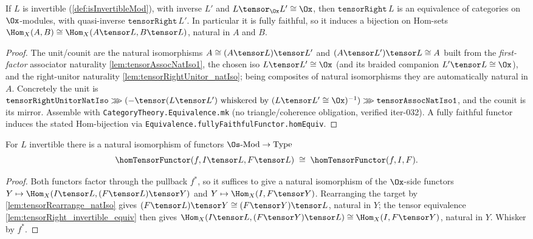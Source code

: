\begin{lemma}

  \label{lem:tensorRight_invertible_equiv}
  If $L$ is invertible (\cref{def:isInvertibleMod}), with inverse $L'$ and
  $L \tensor_{\Ox} L' \cong \Ox$, then $\texttt{tensorRight}\,L$ is an equivalence of
  categories on $\Ox$-modules, with quasi-inverse $\texttt{tensorRight}\,L'$. In
  particular it is fully faithful, so it induces a bijection on Hom-sets
  $\Hom_X(A,B) \cong \Hom_X(A \tensor L, B \tensor L)$, natural in $A$ and $B$.
  \begin{proof}
    The unit/counit are the natural isomorphisms
    $A \cong (A \tensor L) \tensor L'$ and $(A \tensor L') \tensor L \cong A$ built from the
    \emph{first-factor} associator naturality \cref{lem:tensorAssocNatIso1}, the chosen iso
    $L \tensor L' \cong \Ox$ (and its braided companion $L' \tensor L \cong \Ox$), and the
    right-unitor naturality \cref{lem:tensorRightUnitor_natIso}; being composites of natural
    isomorphisms they are automatically natural in $A$. Concretely the unit is
    $\texttt{tensorRightUnitorNatIso} \ggg (-\tensor(L\tensor L')\text{ whiskered by }
    (L\tensor L'\cong\Ox)^{-1}) \ggg \texttt{tensorAssocNatIso1}$, and the counit is its
    mirror. Assemble with \texttt{CategoryTheory.Equivalence.mk} (no triangle/coherence
    obligation, verified iter-032). A fully faithful functor induces the stated Hom-bijection
    via \texttt{Equivalence.fullyFaithfulFunctor.homEquiv}.
  \end{proof}
\end{lemma}

\begin{lemma}

  \label{lem:homTensorFunctor_twist_natIso}
  For $L$ invertible there is a natural isomorphism of functors $\Os\text{-Mod} \to \mathrm{Type}$
  \[
    \homTensorFunctor(f, I \tensor L, F \tensor L)
      \;\cong\; \homTensorFunctor(f, I, F).
  \]
  \begin{proof}
    Both functors factor through the pullback $f^*$, so it suffices to give a natural
    isomorphism of the $\Ox$-side functors $Y \mapsto \Hom_X(I \tensor L, (F \tensor L) \tensor Y)$
    and $Y \mapsto \Hom_X(I, F \tensor Y)$. Rearranging the target by
    \cref{lem:tensorRearrange_natIso} gives $(F \tensor L) \tensor Y \cong (F \tensor Y) \tensor L$,
    natural in $Y$; the tensor equivalence \cref{lem:tensorRight_invertible_equiv} then gives
    $\Hom_X(I \tensor L, (F \tensor Y) \tensor L) \cong \Hom_X(I, F \tensor Y)$, natural in
    $Y$. Whisker by $f^*$.
  \end{proof}
\end{lemma}

